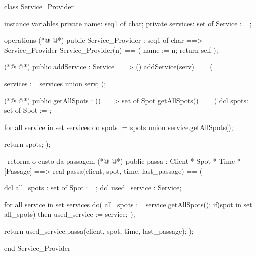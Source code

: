 \begin{vdmpp}[breaklines=true]
class Service_Provider

instance variables
 private name: seq1 of char;
 private services: set of Service := {};
 
operations
(*@
\label{Service:Provider:8}
@*)
 public Service_Provider : seq1 of char ==> Service_Provider
 Service_Provider(n) == (
  name := n;
  return self
 );
 
(*@
\label{addService:14}
@*)
 public addService : Service ==> ()
 addService(serv) == (
  
    services := services union {serv};
 );
 
(*@
\label{getAllSpots:20}
@*)
 public getAllSpots : () ==> set of Spot
 getAllSpots() == (
    dcl spots: set of Spot := {};
    
    for all service in set services do
     spots := spots union service.getAllSpots();
     
   return spots;
 );
 
 --retorna o custo da passagem
(*@
\label{passa:31}
@*)
 public passa : Client * Spot * Time * [Passage] ==> real
 passa(client, spot, time, last_passage) == (
  
   dcl all_spots : set of Spot := {};
   dcl used_service : Service;
  
    for all service in set services do(
    all_spots := service.getAllSpots();
    if(spot in set all_spots) then 
     used_service := service;
   );
  
   return used_service.passa(client, spot, time, last_passage);
 );
 
end Service_Provider
\end{vdmpp}
